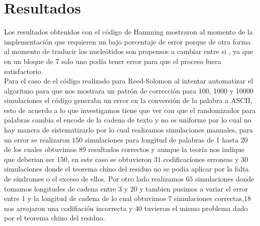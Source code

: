 \section{Resultados}

Los resultados obtenidos con el código de Hamming mostraron al momento de la implementación que requieren un bajo porcentaje de error porque de otra forma al momento de traducir los nucleótidos son propensos a cambiar entre si , ya que  en un bloque de 7 solo uno podía tener error para que el proceso fuera satisfactorio.\\


Para el caso de el código realizado para Reed-Solomon al intentar automatizar el algoritmo para que nos mostrara un patrón de corrección para 100, 1000 y 10000 simulaciones el código generaba un error en la conversión de la palabra a ASCII, esto de acuerdo a lo que investigamos tiene que ver con que el randomizador para palabras cambia el encode de la cadena de texto y no es uniforme por lo cual no hay manera de sistematizarlo por lo cual realizamos simulaciones manuales, para un error se realizaron $150$ simulaciones para longitud de palabras de 1 hasta 20 de los cuales obtuvimos $89$ resultados correctos y aunque la teoría nos indique que deberian ser $150$, en este caso se obtuvieron $31$ codificacíones erroneas y $30$ simulaciones donde el teorema chino del residuo no se podia aplicar por la falta de síndromes o el exceso de ellos. Por otro lado realizamos $65$ simulaciones donde tomamos longitudes de cadena entre 3 y 20 y tambien pusimos a variar el error entre 1 y la longitud de cadena de lo cual obtuvimos $7$ simulaciones correctas,$18$ nos arrojaron una codifiación incorrecta y $40$ tuvieron el mismo problema dado por el teorema chino del residuo.
